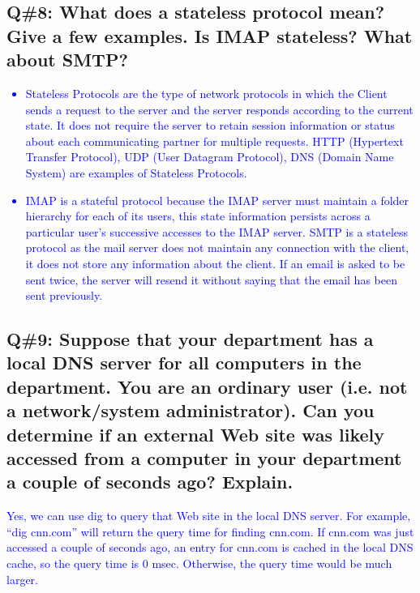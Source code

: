 \subsection*{Q\#8: What does a stateless protocol mean? Give a few examples. Is IMAP stateless? What about SMTP?}
\textcolor{blue}{
\begin{itemize}
  \item Stateless Protocols are the type of network protocols in which the Client sends a request to the server and the server responds according to the current state. It does not require the server to retain session information or status about each communicating partner for multiple requests. HTTP (Hypertext Transfer Protocol), UDP (User Datagram Protocol), DNS (Domain Name System) are examples of Stateless Protocols.
  \item IMAP is a stateful protocol because the IMAP server must maintain a folder hierarchy for each of its users, this state information persists across a particular user's successive accesses to the IMAP server. SMTP is a stateless protocol as the mail server does not maintain any connection with the client, it does not store any information about the client. If an email is asked to be sent twice, the server will resend it without saying that the email has been sent previously.
\end{itemize}
}
\subsection*{Q\#9: Suppose that your department has a local DNS server for all computers in the department. You are an ordinary user (i.e. not a network/system administrator). Can you determine if an external Web site was likely accessed from a computer in your department a couple of seconds ago? Explain.}
\textcolor{blue}{
Yes, we can use dig to query that Web site in the local DNS server. For example, “dig cnn.com” will return the query time for finding cnn.com. If cnn.com was just accessed a couple of seconds ago, an entry for cnn.com is cached in the local DNS cache, so the query time is 0 msec. Otherwise, the query time would be much larger.
}\\
